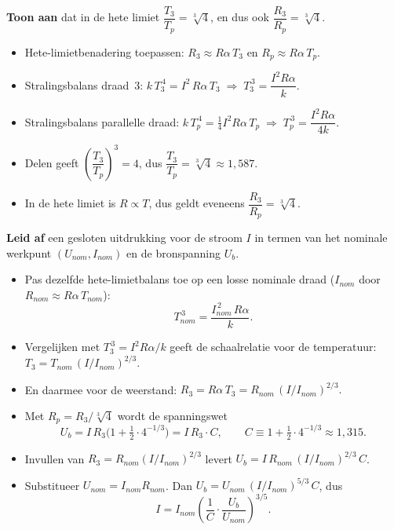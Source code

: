 \documentclass[addpoints,11pt,a4paper]{exam}
\begin{document}
\begin{questions}
\question[5]
\textbf{Toon aan} dat in de hete limiet $\dfrac{T_3}{T_p} = \sqrt[3]{4}$, en dus ook $\dfrac{R_3}{R_p} = \sqrt[3]{4}$.

\begin{solution}
\begin{itemize}
  \item Hete-limietbenadering toepassen: $R_3 \approx R\alpha\,T_3$ en $R_p \approx R\alpha\,T_p$.
  \item Stralingsbalans draad~3: $k\,T_3^{\,4} = I^2\,R\alpha\,T_3 \;\Rightarrow\; T_3^{\,3} = \dfrac{I^2 R\alpha}{k}.$
  \item Stralingsbalans parallelle draad: $k\,T_p^{\,4} = \tfrac{1}{4}I^2 R\alpha\,T_p \;\Rightarrow\; T_p^{\,3} = \dfrac{I^2 R\alpha}{4k}.$
  \item Delen geeft $\left(\dfrac{T_3}{T_p}\right)^{\!3} = 4$, dus $\dfrac{T_3}{T_p} = \sqrt[3]{4} \approx 1{,}587$.
  \item In de hete limiet is $R \propto T$, dus geldt eveneens $\dfrac{R_3}{R_p} = \sqrt[3]{4}$.
\end{itemize}
\end{solution}

\question[6]
\textbf{Leid af} een gesloten uitdrukking voor de stroom $I$ in termen van het nominale werkpunt $(U_{nom}, I_{nom})$ en de bronspanning $U_b$.

\begin{solution}
\begin{itemize}
  \item Pas dezelfde hete-limietbalans toe op een losse nominale draad ($I_{nom}$ door $R_{nom} \approx R\alpha\,T_{nom}$):
    \[T_{nom}^{\,3} = \dfrac{I_{nom}^{\,2}\, R\alpha}{k}.\]
  \item Vergelijken met $T_3^{\,3} = I^{2} R\alpha/k$ geeft de schaalrelatie voor de temperatuur:
    $T_3 = T_{nom}\,(I/I_{nom})^{2/3}.$
  \item En daarmee voor de weerstand: $R_3 = R\alpha\,T_3 = R_{nom}\,(I/I_{nom})^{2/3}.$
  \item Met $R_p = R_3/\sqrt[3]{4}$ wordt de spanningswet
    \[U_b = I\,R_3\bigl(1 + \tfrac{1}{2}\cdot 4^{-1/3}\bigr) = I\,R_3\cdot C,
      \qquad C \equiv 1 + \tfrac{1}{2}\cdot 4^{-1/3} \approx 1{,}315.\]
  \item Invullen van $R_3 = R_{nom}(I/I_{nom})^{2/3}$ levert $U_b = I\,R_{nom}\,(I/I_{nom})^{2/3}\,C$.
  \item Substitueer $U_{nom} = I_{nom}R_{nom}$. Dan $U_b = U_{nom}\,(I/I_{nom})^{5/3}\,C$, dus
    \[\boxed{\;I = I_{nom}\!\left(\frac{1}{C}\cdot\frac{U_b}{U_{nom}}\right)^{\!3/5}.\;}\]
\end{itemize}
\end{solution}


\end{questions}
\end{document}
